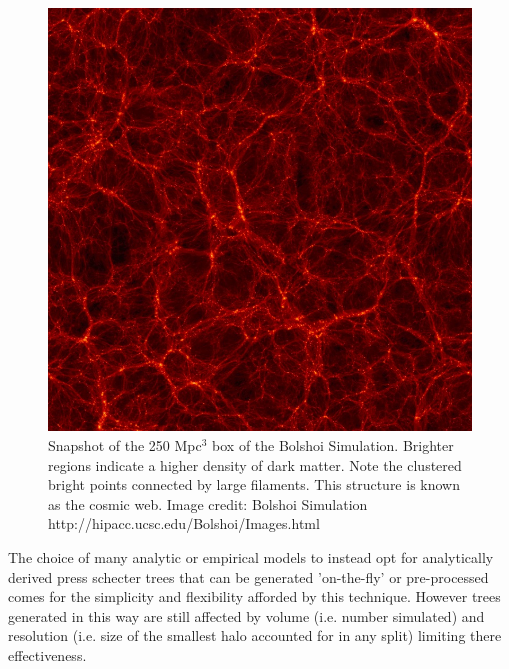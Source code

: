 \begin{figure}[h]
    \centering
    \includegraphics[width = \linewidth]{Figures/Chapter2/Bolshoi.jpg}
    \caption{Snapshot of the 250 Mpc$^3$ box of the Bolshoi Simulation. Brighter regions indicate a higher density of dark matter. Note the clustered bright points connected by large filaments. This structure is known as the cosmic web.
    Image credit: Bolshoi Simulation http://hipacc.ucsc.edu/Bolshoi/Images.html}
    \label{fig:Bolshoi}
\end{figure}

The choice of many analytic or empirical models to instead opt for analytically derived press schecter trees that can be generated 'on-the-fly' or pre-processed comes for the simplicity and flexibility afforded by this technique. However trees generated in this way are still affected by volume (i.e. number simulated) and resolution (i.e. size of the smallest halo accounted for in any split) limiting there effectiveness.

